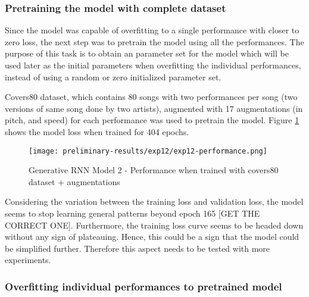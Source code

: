 \documentclass[../main.tex]{subfiles}
\begin{document}
\iffalse
\begin{figure}[h]
    \centering
    \texttt{[image: preliminary-results/exp10/exp10-performance.png]}
    \caption{Generative RNN Model 2 - Performance}
    \label{fig:exp10-performance}
\end{figure}
\fi

\subsubsection{Pretraining the model with complete dataset}

\par
Since the model was capable of overfitting to a single performance with closer to zero loss, the next step was to pretrain the model using all the performances. The purpose of this task is to obtain an parameter set for the model which will be used later as the initial parameters when overfitting the individual performances, instead of using a random or zero initialized parameter set.

\par
Covers80 dataset, which contains 80 songs with two performances per song (two versions of same song done by two artists), augmented with 17 augmentations (in pitch, and speed) for each performance was used to pretrain the model. Figure \ref{fig:exp12-performance} shows the model loss when trained for 404 epochs. 

\begin{figure}[h]
    \centering
    \texttt{[image: preliminary-results/exp12/exp12-performance.png]}
    \caption{Generative RNN Model 2 - Performance when trained with covers80 dataset + augmentations}
    \label{fig:exp12-performance}
\end{figure}

\par
Considering the variation between the training loss and validation loss, the model seems to stop learning general patterns beyond epoch 165 [GET THE CORRECT ONE]. Furthermore, the training loss curve seems to be headed down without any sign of plateauing. Hence, this could be a sign that the model could be simplified further. Therefore this aspect needs to be tested with more experiments.



\subsubsection{Overfitting individual performances to pretrained model}
\end{document}
